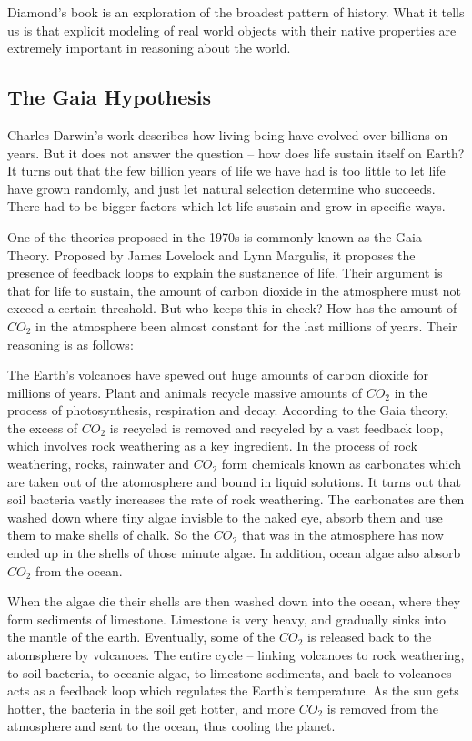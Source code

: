 Diamond's book is an exploration of the broadest pattern of history. What it tells us is that explicit modeling of real world objects with their native properties are extremely important in reasoning about the world.

\subsection{The Gaia Hypothesis}
Charles Darwin's work describes how living being have evolved over billions on years. But it does not answer the question -- how does life sustain itself on Earth? It turns out that the few billion years of life we have had is too little to let life have grown randomly, and just let natural selection determine who succeeds. There had to be bigger factors which let life sustain and grow in specific ways.

One of the theories proposed in the 1970s is commonly known as the Gaia Theory. Proposed by James Lovelock and Lynn Margulis, it proposes the presence of feedback loops to explain the sustanence of life. Their argument is that for life to sustain, the amount of carbon dioxide in the atmosphere must not exceed a certain threshold. But who keeps this in check? How has the amount of $CO_2$ in the atmosphere been almost constant for the last millions of years. Their reasoning is as follows:

The Earth's volcanoes have spewed out huge amounts of carbon dioxide for millions of years. Plant and animals recycle massive amounts of $CO_2$ in the process of photosynthesis, respiration and decay. According to the Gaia theory, the excess of $CO_2$ is recycled is removed and recycled by a vast feedback loop, which involves rock weathering as a key ingredient. In the process of rock weathering, rocks, rainwater and $CO_2$ form chemicals known as carbonates which are taken out of the atomosphere and bound in liquid solutions. It turns out that soil bacteria vastly increases the rate of rock weathering. The carbonates are then washed down where tiny algae invisble to the naked eye, absorb them and use them to make shells of chalk. So the $CO_2$ that was in the atmosphere has now ended up in the shells of those minute algae. In addition, ocean algae also absorb $CO_2$ from the ocean.  

When the algae die their shells are then washed down into the ocean, where they form sediments of limestone. Limestone is very heavy, and gradually sinks into the mantle of the earth. Eventually, some of the $CO_2$ is released back to the atomsphere by volcanoes. The entire cycle -- linking volcanoes to rock weathering, to soil bacteria, to oceanic algae, to limestone sediments, and back to volcanoes -- acts as a feedback loop which regulates the Earth's temperature. As the sun gets hotter, the bacteria in the soil get hotter, and more $CO_2$ is removed from the atmosphere and sent to the ocean, thus cooling the planet.

